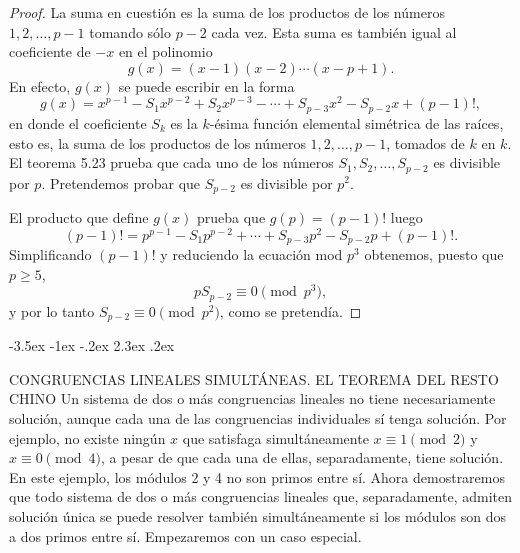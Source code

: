 \documentclass[12pt,a4paper]{book}
\makeatletter
\renewcommand\section{\@startsection{section}{1}{\z@}%
  {-3.5ex \@plus -1ex \@minus -.2ex}%
  {2.3ex \@plus .2ex}%
  {\normalfont\Large\bfseries\raggedright}}
\makeatother
\begin{document}
    \begin{proof}
        La suma en cuestión es la suma de los productos de los números $1,2,\dots,p-1$
        tomando sólo $p-2$ cada vez. Esta suma es también igual al coeficiente de $-x$ en
        el polinomio
        \begin{equation*}
            g(x)=(x-1)(x-2)\cdots(x-p+1).
        \end{equation*}
        En efecto, $g(x)$ se puede escribir en la forma
        \begin{equation*}
            g(x)=x^{p-1}-S_{1}x^{p-2}+S_{2}x^{p-3}-\cdots+S_{p-3}x^{2}-S_{p-2}x+(p-1)!,
        \end{equation*}
        en donde el coeficiente $S_{k}$ es la $k$-ésima función elemental simétrica de las
        raíces, esto es, la suma de los productos de los números $1,2,\dots,p-1$,
        tomados de $k$ en $k$. El teorema 5.23 prueba que cada uno de los números
        $S_{1},S_{2},\dots,S_{p-2}$ es divisible por $p$. Pretendemos probar que $S_{p-2}$ es
        divisible por $p^{2}$.

        El producto que define $g(x)$ prueba que $g(p)=(p-1)!$ luego
        \begin{equation*}
            (p-1)!=p^{p-1}-S_{1}p^{p-2}+\cdots+S_{p-3}p^{2}-S_{p-2}p+(p-1)!.
        \end{equation*}
        Simplificando $(p-1)!$ y reduciendo la ecuación mod $p^{3}$ obtenemos, puesto que
        $p\geq5$,
        \begin{equation*}
            pS_{p-2}\equiv0\pmod{p^{3}},
        \end{equation*}
        y por lo tanto $S_{p-2}\equiv0\pmod{p^{2}}$, como se pretendía.
    \end{proof}

    \section{CONGRUENCIAS LINEALES SIMULTÁNEAS. EL TEOREMA DEL RESTO CHINO}
    Un sistema de dos o más congruencias lineales no tiene necesariamente solución,
    aunque cada una de las congruencias individuales sí tenga solución. Por ejemplo, no
    existe ningún $x$ que satisfaga simultáneamente $x\equiv1\pmod{2}$ y
    $x\equiv0\pmod{4}$, a pesar de que cada una de ellas, separadamente, tiene solución.
    En este ejemplo, los módulos 2 y 4 no son primos entre sí. Ahora demostraremos que
    todo sistema de dos o más congruencias lineales que, separadamente, admiten solución
    única se puede resolver también simultáneamente si los módulos son dos a dos primos
    entre sí. Empezaremos con un caso especial.
\end{document}
